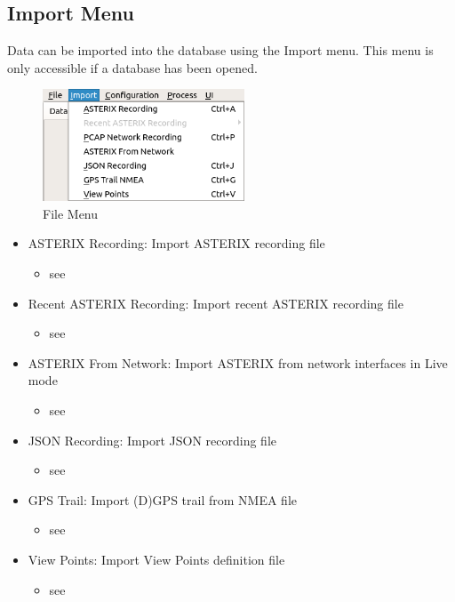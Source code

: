 \subsection{Import Menu}
\label{sec:ui_overview_import_menu}

Data can be imported into the database using the Import menu. This menu is only accessible if a database has been opened.

\begin{figure}[H]
  \center
    \includegraphics[width=6cm,frame]{figures/ui_import_menu.png}
  \caption{File Menu}
\end{figure}

\begin{itemize}
 \item ASTERIX Recording: Import ASTERIX recording file
 \begin{itemize}
 \item see 
 \end{itemize}
 \item Recent ASTERIX Recording: Import recent ASTERIX recording file
  \begin{itemize}
 \item see 
 \end{itemize}
 \item ASTERIX From Network: Import ASTERIX from network interfaces in Live mode
  \begin{itemize}
 \item see 
 \end{itemize}
 \item JSON Recording: Import JSON recording file
  \begin{itemize}
 \item see 
 \end{itemize}
 \item GPS Trail: Import (D)GPS trail from NMEA file
  \begin{itemize}
 \item see 
 \end{itemize}
 \item View Points: Import View Points definition file
  \begin{itemize}
 \item see 
 \end{itemize}
\end{itemize}
\  \\


